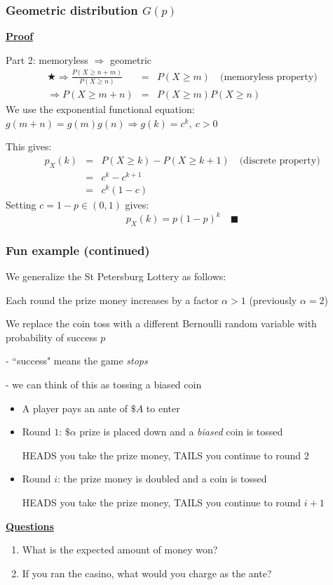 \documentclass[t,8pt]{beamer}%
\begin{document}
	\begin{frame}
		\frametitle{Geometric distribution $G(p)$}
		{\bf\underline{Proof}} \par
		Part 2: memoryless $\Rightarrow$ geometric
        \begin{eqnarray*}
            \bigstar\Rightarrow \frac{P(X\geq n+m)}{P(X\geq n)}&=&P(X\geq m)\quad\text{(memoryless property)}\\
            \Rightarrow P(X\geq m+n)&=&P(X\geq m)P(X\geq n)
        \end{eqnarray*}
        We use the exponential functional equation: $g(m+n)=g(m)g(n)\Rightarrow g(k)=c^k,\ c>0$ \par
        This gives:
        \begin{eqnarray*}
            p_X(k)&=&P(X\geq k)-P(X\geq k+1)\quad\text{(discrete property)}\\
            &=&c^{k}-c^{k+1}\\
            &=&c^{k}(1-c)
        \end{eqnarray*}
        Setting $c=1-p\in(0,1)$ gives:
        $$p_X(k)=p(1-p)^{k}\quad\blacksquare$$
	\end{frame}

\begin{frame}
\frametitle{Fun example (continued)}
We generalize the St Petersburg Lottery as follows: \par
Each round the prize money increases by a factor $\alpha>1$ (previously $\alpha=2$) \par
We replace the coin toss with a different Bernoulli random variable with probability of success $p$ \par
{\small\color{NavyBlue} - ``success" means the game {\it stops} \par
- we can think of this as tossing a biased coin}

\begin{itemize}
    \item A player pays an ante of $\$A$ to enter
    \item Round $1$: $\$\alpha$ prize is placed down and a {\it biased} coin is tossed \par
    HEADS you take the prize money, TAILS you continue to round $2$
    \item Round $i$: the prize money is doubled and a coin is tossed \par
    HEADS you take the prize money, TAILS you continue to round $i+1$
\end{itemize}
{\bf\underline{Questions}}
\begin{enumerate}
    \item What is the expected amount of money won?
    \item If you ran the casino, what would you charge as the ante?
\end{enumerate}
\end{frame}
\end{document}
